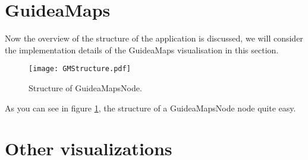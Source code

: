 \section{GuideaMaps}
Now the overview of the structure of the application is discussed, we will consider the implementation details of the GuideaMaps visualisation in this section.
\begin{figure}[H]
	\centering
	\texttt{[image: GMStructure.pdf]}
	\caption{Structure of GuideaMapsNode.}
	\label{fig:gmnodestructure}
\end{figure}

As you can see in figure \ref{fig:gmnodestructure}, the structure of a GuideaMapsNode node quite easy.




\section{Other visualizations}














